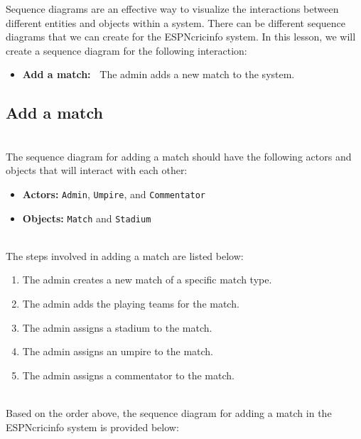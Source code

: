

Sequence diagrams are an effective way to visualize the interactions between different entities and objects within a system. There can be different sequence diagrams that we can create for the ESPNcricinfo system. In this lesson, we will create a sequence diagram for the following interaction:

\begin{itemize}
\item
\protect{}\label{WF7vd6yNUBS5xmkrskw8P}
\textbf{Add a match:~} The admin adds a new match to the system.
\end{itemize}

\subsection{Add a match}\label{m0UUdq9xswCxDBg-vK36V}
\\
The sequence diagram for adding a match should have the following actors and objects that will interact with each other:

\begin{itemize}
\item
\protect{}\label{zyN1vrztRaw9x1u75Paoz}
\textbf{Actors:} \texttt{Admin}, \texttt{Umpire}, and \texttt{Commentator}
\item
\protect{}\label{78zUBaoGyK9ksYjbV92lz}
\textbf{Objects:} \texttt{Match} and \texttt{Stadium}
\end{itemize}
\\
The steps involved in adding a match are listed below:

\begin{enumerate}
\item
\protect{}\label{_FGNct_vA6r-RuGSpcfQm}
The admin creates a new match of a specific match type.
\item
\protect{}\label{djCHdBTTvk00V70BD7Wgv}
The admin adds the playing teams for the match.
\item
\protect{}\label{-xSrjuVbPA9SsScfdvMCf}
The admin assigns a stadium to the match.
\item
\protect{}\label{ubXvTiJ-Y0w27qkPx2OeU}
The admin assigns an umpire to the match.
\item
\protect{}\label{duqWiU-Ag3ehkVCFnrKPk}
The admin assigns a commentator to the match.
\end{enumerate}
\\
Based on the order above, the sequence diagram for adding a match in the ESPNcricinfo system is provided below:

